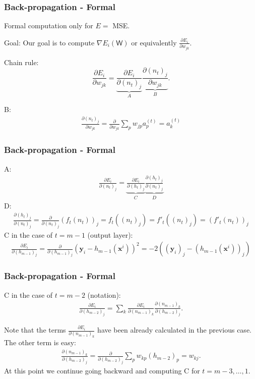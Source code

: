 \documentclass{beamer}
\begin{document}
	\begin{frame}
		\frametitle{Back-propagation - Formal}
		Formal computation only for $E =$ MSE.
		
		\vspace{5mm}
		
		Goal: Our goal is to compute $\nabla E_i(\mathsf{W})$ or equivalently $\frac{\partial E_i}{\partial w_{jk}}$.
		
		\vspace{5mm}
		
		Chain rule:
		\begin{equation*}
			\frac{\partial E_i}{\partial w_{jk}} = \underbrace{\frac{\partial E_i}{\partial (n_t)_{j}}}_{A} \underbrace{\frac{\partial (n_t)_{j}}{\partial w_{jk}}}_{B}.
		\end{equation*}
		
		B:
		\begin{align*}
			\frac{\partial (n_t)_{j}}{\partial w_{jk}} = \frac{\partial}{\partial w_{jk}} \sum_{p} w_{jp} a^{(t)}_p =   a^{(t)}_k
		\end{align*}
	\end{frame}

	\begin{frame}
		\frametitle{Back-propagation - Formal}
		A:
		\begin{align*}
			\frac{\partial E_i}{\partial (n_t)_{j}} = \underbrace{\frac{\partial E_i}{\partial (h_t)_j}}_{C} \underbrace{\frac{\partial (h_t)_j}{\partial (n_t)_{j}}}_{D}
		\end{align*}
		D:
		\begin{align*}
			\frac{\partial (h_t)_j}{\partial (n_t)_j} = \frac{\partial}{\partial (n_t)_{j}} (f_t(n_t))_j = f_t((n_t)_j) = f'_t((n_t)_j) = (f'_t(n_t))_j
		\end{align*}
		C in the case of $t = m-1$ (output layer):
		\begin{align*}
			\frac{\partial E_i}{\partial (h_{m-1})_j} = \frac{\partial}{\partial (h_{m-1})_j} (\bm{y}_i - h_{m-1}(\bm{x}^i))^2 = -2((\bm{y}_i)_j - (h_{m-1}(\bm{x}^i))_j)
		\end{align*}
	\end{frame}

	\begin{frame}
		\frametitle{Back-propagation - Formal}
		
		
		C in the case of $t = m-2$ (notation):
		\begin{align*}
			\frac{\partial E_i}{\partial (h_{m-2})_j} = \sum_k \frac{\partial E_i}{\partial (n_{m-1})_k} \frac{\partial (n_{m-1})_k}{\partial (h_{m-2})_j}.
		\end{align*}
	
		Note that the terms $\frac{\partial E_i}{\partial (n_{m-1})_k}$ have been already calculated in the previous case. The other term is easy:
		\begin{align*}
			\frac{\partial (n_{m-1})_k}{\partial (h_{m-2})_j} = \frac{\partial}{\partial (h_{m-2})_j}\sum_{p} w_{kp} (h_{m-2})_p = {w}_{kj}.
		\end{align*}
		At this point we continue going backward and computing C for $t = m-3, \dots, 1$.
	\end{frame}
\end{document}
